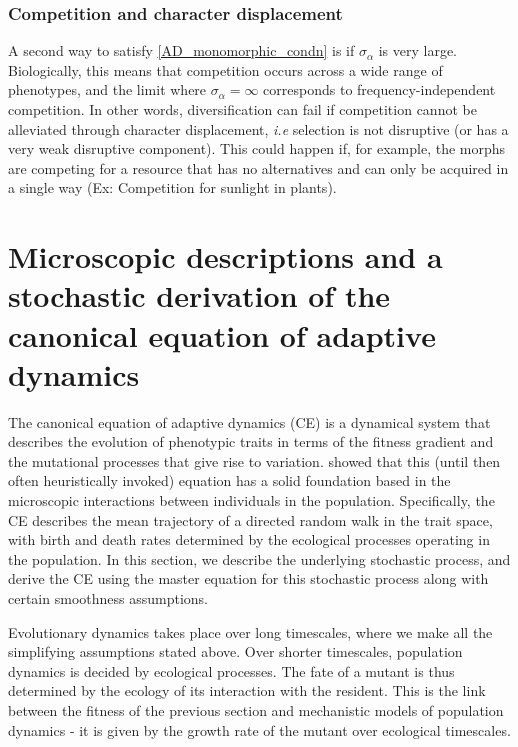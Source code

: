 \subsubsection{Competition and character displacement}
A second way to satisfy \ref{AD_monomorphic_condn} is if $\sigma_{\alpha}$ is very large. Biologically, this means that competition occurs across a wide range of phenotypes, and the limit where $\sigma_{\alpha} = \infty$ corresponds to frequency-independent competition. In other words, diversification can fail if competition cannot be alleviated through character displacement, \emph{i.e} selection is not disruptive (or has a very weak disruptive component). This could happen if, for example, the morphs are competing for a resource that has no alternatives and can only be acquired in a single way (Ex: Competition for sunlight in plants).

\section{Microscopic descriptions and a stochastic derivation of the canonical equation of adaptive dynamics}
\label{section:microscopic-descriptions-CE}

The canonical equation of adaptive dynamics (CE) is a dynamical system that describes the evolution of phenotypic traits in terms of the fitness gradient and the mutational processes that give rise to variation.
\cite{dieckmann_dynamical_1996} showed that this (until then often heuristically invoked) equation has a solid foundation based in the microscopic interactions between individuals in the population.
Specifically, the CE describes the mean trajectory of a directed random walk in the trait space, with birth and death rates determined by the ecological processes operating in the population. 
In this section, we describe the underlying stochastic process, and derive the CE using the master equation for this stochastic process along with certain smoothness assumptions. 

Evolutionary dynamics takes place over long timescales, where we make all the simplifying assumptions stated above. 
Over shorter timescales, population dynamics is decided by ecological processes.
The fate of a mutant is thus determined by the ecology of its interaction with the resident. 
This is the link between the fitness of the previous section and mechanistic models of population dynamics - it is given by the growth rate of the mutant over ecological timescales. 

